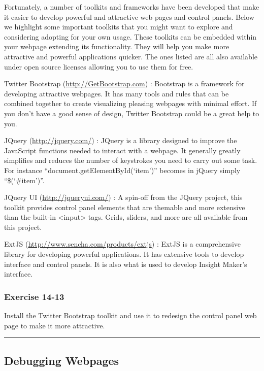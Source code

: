 \documentclass[]{memoir}
\begin{document}
Fortunately, a number of toolkits and frameworks have been developed
that make it easier to develop powerful and attractive web pages and
control panels. Below we highlight some important toolkits that you
might want to explore and considering adopting for your own usage. These
toolkits can be embedded within your webpage extending its
functionality. They will help you make more attractive and powerful
applications quicker. The ones listed are all also available under open
source licenses allowing you to use them for free.

Twitter Bootstrap (\url{http://GetBootstrap.com}) : Bootstrap is a
framework for developing attractive webpages. It has many tools and
rules that can be combined together to create visualizing pleasing
webpages with minimal effort. If you don't have a good sense of design,
Twitter Bootstrap could be a great help to you.

JQuery (\url{http://jquery.com/}) : JQuery is a library designed to
improve the JavaScript functions needed to interact with a webpage. It
generally greatly simplifies and reduces the number of keystrokes you
need to carry out some task. For instance
``document.getElementById(`item')'' becomes in jQuery simply
``\$(`\#item')''.

JQuery UI (\url{http://jqueryui.com/}) : A spin-off from the JQuery
project, this toolkit provides control panel elements that are themable
and more extensive than the built-in \textless{}input\textgreater{}
tags. Grids, sliders, and more are all available from this project.

ExtJS (\url{http://www.sencha.com/products/extjs}) : ExtJS is a
comprehensive library for developing powerful applications. It has
extensive tools to develop interface and control panels. It is also what
is used to develop Insight Maker's interface.

\subsubsection{Exercise 14-13}

Install the Twitter Bootstrap toolkit and use it to redesign the control
panel web page to make it more attractive.

\begin{center}\rule{3in}{0.4pt}\end{center}

\subsection{Debugging Webpages}
\end{document}
